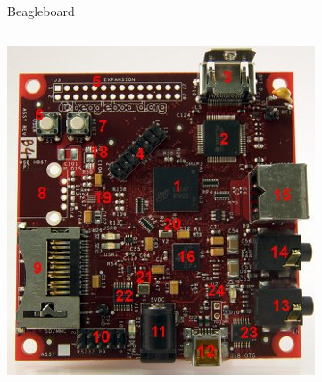 \documentclass{beamer}
\begin{document}
\begin{frame}{Beagleboard}
\begin{columns}[c]
\includegraphics[width=\textwidth]{../img/beagleboard}

\end{columns}
\end{frame}
\end{document}
